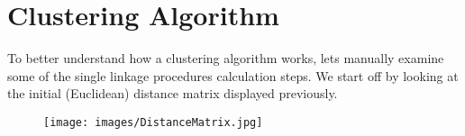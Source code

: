 \documentclass[a4paper,12pt]{article}
\begin{document}
\section{Clustering Algorithm}
To better understand how a clustering algorithm works, lets manually examine
some of the single linkage procedures calculation steps. We start off by looking at
the initial (Euclidean) distance matrix displayed previously.

\begin{figure}[h!]
	\begin{center}
		\texttt{[image: images/DistanceMatrix.jpg]}\\
	\end{center}
\end{figure}
\end{document}
